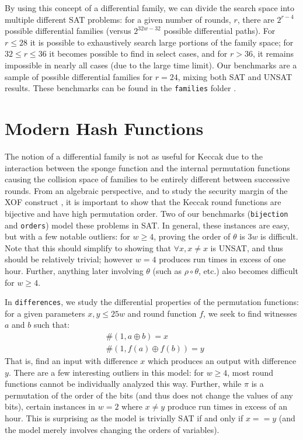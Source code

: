\documentclass[final]{ieee}
\begin{document}
By using this concept of a differential family, we can divide the search space
into multiple different SAT problems: for a given number of rounds, $r$, there
are $2^{r-4}$ possible differential families (versus $2^{32w-32}$ possible
differential paths). For $r \leq 28$ it is possible to exhaustively search
large portions of the family space; for $32 \leq r \leq 36$ it becomes possible
to find in select cases, and for $r > 36$, it remains impossible in nearly all
cases (due to the large time limit). Our benchmarks are a sample of possible
differential families for $r=24$, mixing both SAT and UNSAT results. These
benchmarks can be found in the \texttt{families} folder \cite{Sat2018}.


\section{Modern Hash Functions}

The notion of a differential family is not as useful for Keccak due to
the interaction between the sponge function and the internal permutation
functions causing the collision space of families to be entirely different
between successive rounds. From an algebraic perspective, and to study the
security margin of the XOF construct \cite{Keccak3}, it is important to show
that the Keccak round functions are bijective and have high permutation order.
Two of our benchmarks (\texttt{bijection} and \texttt{orders}) model these
problems in SAT. In general, these instances are easy, but with a few notable
outliers: for $w \geq 4$, proving the order of $\theta$ is $3w$ is difficult.
Note that this should simplify to showing that $\forall x, x \neq x$ is UNSAT,
and thus should be relatively trivial; however $w=4$ produces run times in
excess of one hour. Further, anything later involving $\theta$ (such as
$\rho \circ \theta$, etc.) also becomes difficult for $w\geq4$.

In \texttt{differences}, we study the differential properties of the
permutation functions: for a given parameters $x, y \leq 25w$ and round
function $f$, we seek to find witnesses $a$ and $b$ such that:
\begin{align*}
    & \#(1, a \oplus b) = x \\
    & \#(1, f(a) \oplus f(b)) = y
\end{align*}
That is, find an input with difference $x$ which produces an output with
difference $y$. There are a few interesting outliers in this model: for
$w\geq4$, most round functions cannot be individually analyzed this way.
Further, while $\pi$ is a permutation of the order of the bits (and thus
does not change the values of any bits), certain instances in $w=2$
where $x \neq y$ produce run times in excess of an hour. This is surprising
as the model is trivially SAT if and only if $x == y$ (and the model merely
involves changing the orders of variables).
\end{document}
